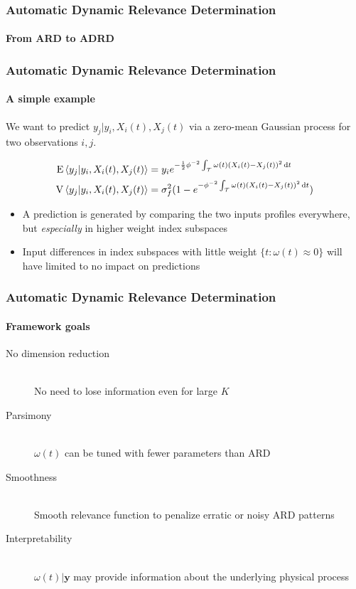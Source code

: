 \documentclass{snedecorbeamer}
\begin{document}
\begin{frame}
  \frametitle{Automatic Dynamic Relevance Determination}
  \framesubtitle{From ARD to ADRD}

  

\end{frame}

\begin{frame}
  \frametitle{Automatic Dynamic Relevance Determination}
  \framesubtitle{A simple example}

  We want to predict $y_j | y_i, X_i(t), X_j(t)$ via a zero-mean Gaussian
  process for two observations $i, j$.

  \begin{align}
    \operatorname{E}\left\langle y_j | y_i, X_i(t), X_j(t)\right\rangle
    &=
    y_i e^{-\frac{1}{2}\phi^{-2} \int_\mathcal{T}
    {\omega(t) \left(X_i(t) - X_j(t)\right)}^2\,\mathrm{d}t} \\
    \operatorname{V}\left\langle y_j | y_i, X_i(t), X_j(t)\right\rangle
    &=
      \sigma_f^2
      (1 - e^{-\phi^{-2} \int_\mathcal{T}
    {\omega(t) \left(X_i(t) - X_j(t)\right)}^2\,\mathrm{d}t})
  \end{align}

  \begin{itemize}
  \item A prediction is generated by comparing the two inputs profiles
    everywhere, but \emph{especially} in higher weight index subspaces
  \item Input differences in index subspaces with little weight
    $\{t:\omega(t)\approx0\}$ will have limited to no impact on predictions
  \end{itemize}
\end{frame}

\begin{frame}
  \frametitle{Automatic Dynamic Relevance Determination}
  \framesubtitle{Framework goals}

  \begingroup
  \begin{description}
  \item[No dimension reduction] \mbox{}\\
    No need to lose information even for large $K$
  \item[Parsimony] \mbox{}\\
    $\omega(t)$ can be tuned with fewer parameters than \textsc{ARD}
  \item[Smoothness] \mbox{}\\
    Smooth relevance function to penalize erratic or noisy \textsc{ARD} patterns
  \item[Interpretability] \mbox{}\\
    $\omega(t) | \mathbf{y}$ may provide information about the underlying
    physical process
  \end{description}
  \endgroup
\end{frame}
\end{document}
